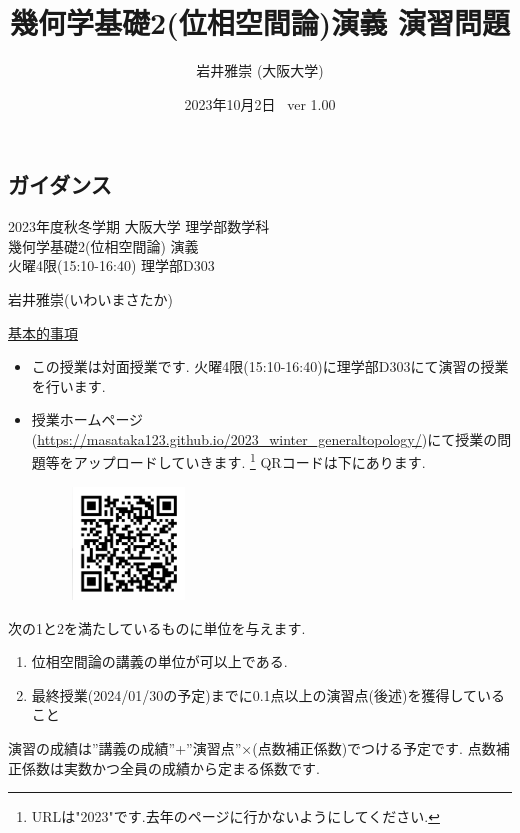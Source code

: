 \documentclass[dvipdfmx,a4paper,11pt]{article}
\title{幾何学基礎2(位相空間論)演義 演習問題}
\author{岩井雅崇 (大阪大学)}
\date{2023年10月2日 \, ver 1.00}
\theoremstyle{definition}
\begin{document}
\maketitle
\tableofcontents
\newpage

\begin{center}
\setcounter{section}{-1}
\section{ガイダンス}
\label{sec-guide}
\end{center}

\begin{center}
{\Large 2023年度秋冬学期 大阪大学 理学部数学科 \\ 幾何学基礎2(位相空間論) 演義} \\
 火曜4限(15:10-16:40) 理学部D303
\end{center}
\begin{flushright}
 岩井雅崇(いわいまさたか) \\
\end{flushright}
{\Large \underline{基本的事項}}
\begin{itemize}
  \setlength{\parskip}{0cm} %
  \setlength{\itemsep}{0cm} %
\item この授業は対面授業です. 火曜4限(15:10-16:40)に理学部D303にて演習の授業を行います.
\item 授業ホームページ(\url{https://masataka123.github.io/2023_winter_generaltopology/})にて授業の問題等をアップロードしていきます. \footnote{URLは"2023"です.去年のページに行かないようにしてください. }
QRコードは下にあります.
\begin{figure}[htbp]
\begin{center}
 \includegraphics[height=30mm, width=30mm]{genetopo.png}
\end{center}
\end{figure}
\end{itemize}


次の1と2を満たしているものに単位を与えます.
\begin{enumerate}
  \setlength{\parskip}{0cm} %
  \setlength{\itemsep}{0cm} %
\item 位相空間論の講義の単位が可以上である.
\item 最終授業(2024/01/30の予定)までに0.1点以上の演習点(後述)を獲得していること
\end{enumerate}
演習の成績は”講義の成績”+”演習点”×(点数補正係数)でつける予定です. 点数補正係数は実数かつ全員の成績から定まる係数です.
\end{document}
